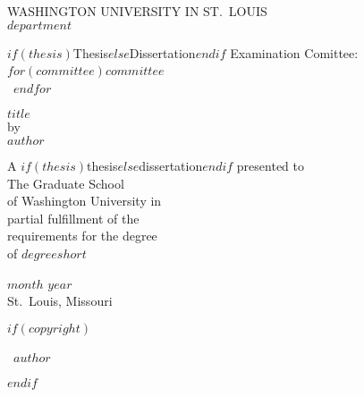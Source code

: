 \documentclass[12pt, oneside, openany]{book}
\begin{document}
\pagestyle{plain}

\frontmatter

\clearpage
\thispagestyle{empty}
\singlespacing
\begin{center}
    WASHINGTON UNIVERSITY IN ST.~LOUIS\\[\baselineskip]

    $department$

    \vfill

    $if(thesis)$Thesis$else$Dissertation$endif$ Examination Comittee:\\
    $for(committee)$$committee$~\\~$endfor$

    \vfill

    $title$\\
    by\\
    $author$

    \vfill

    A $if(thesis)$thesis$else$dissertation$endif$ presented to\\
    The Graduate School\\
    of Washington University in\\
    partial fulfillment of the\\
    requirements for the degree\\
    of $degreeshort$

    \vfill

    $month$ $year$\\
    St.~Louis, Missouri
\end{center}
\clearpage

$if(copyright)$
    \thispagestyle{empty}
    \null
    \vfill
    \begin{center}
        \textcopyright\ $author$
    \end{center}
    \vfill
    \clearpage
$endif$

\setcounter{page}{2}
\tableofcontents

\cleardoublepage
{}
{}
\listoffigures

\cleardoublepage
{}
{}
\listoftables
\end{document}

